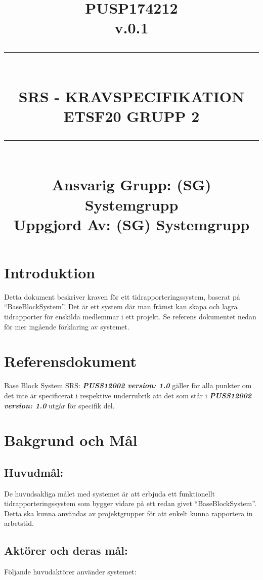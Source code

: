 \documentclass[paper=a4, fontsize=11pt,twoside]{article}
\title{
\documentNumber{#1}																						
\documentVersion{#2}																				
\HRule{0.5pt} \\ %
\LARGE \textbf{\uppercase{#3}} \\
\large \textbf{\uppercase{ETSF20 Grupp 2}} 
\HRule{2pt} \\ [1.5cm]    
\normalsize            
\documentResponsible{#4} \\ 
\documentCreator{#4}  
}
\newcommand{\HRule}[1]{\rule{\linewidth}{#1}}
\newcommand{\documentNumber}[1]{\centering PUSP1742#1 \\[1.0cm]}
\newcommand{\documentVersion}[1]{\centering \small{v.#1} \\[1.0cm]}
\newcommand{\documentResponsible}[1]{\centering  Ansvarig Grupp: #1}
\newcommand{\documentCreator}[1]{\centering Uppgjord Av: #1}
\newcommand{\grouptitlepage}[4]{ 
\title{
\documentNumber{#1}																						
\documentVersion{#2}																				
\HRule{0.5pt} \\ %
\LARGE \textbf{\uppercase{#3}} \\
\large \textbf{\uppercase{ETSF20 Grupp 2}} 
\HRule{2pt} \\ [1.5cm]    
\normalsize            
\documentResponsible{#4} \\ 
\documentCreator{#4}  
}																							
\maketitle																							
\thispagestyle{empty} 																	\newpage 				
 
}
\begin{document}
\grouptitlepage
{12}
{0.1}
{SRS - Kravspecifikation}
{(SG) Systemgrupp}	
\tableofcontents
\section{Introduktion}
Detta dokument beskriver kraven för ett tidrapporteringssystem, baserat på “BaseBlockSystem”. Det är ett system där man främst kan skapa och lagra tidrapporter för enskilda medlemmar i ett projekt. Se referens dokumentet nedan för mer ingående förklaring av systemet.
\section{Referensdokument}
Base Block System SRS: \textbf{\textit{PUSS12002 version: 1.0}}  gäller för alla punkter	 om det inte är specificerat i respektive underrubrik att det som står i \textbf{\textit{PUSS12002 version: 1.0}}  utgår för specifik del.

\newpage
\section{Bakgrund och Mål}
\subsection{Huvudmål:}
De huvudsakliga målet med systemet är att erbjuda ett funktionellt tidrapporteringssystem som bygger vidare på ett redan givet “BaseBlockSystem”. Detta ska kunna användas av projektgrupper för att enkelt kunna rapportera in arbetstid.
\subsection{Aktörer och deras mål:}
Följande huvudaktörer använder systemet:
\end{document}
